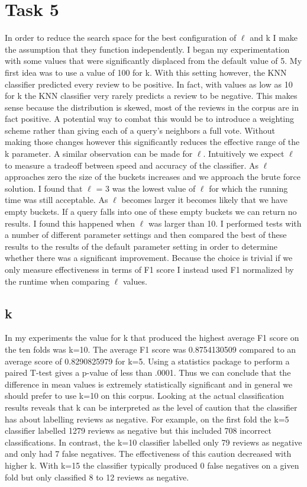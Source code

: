 \documentclass[paper=a4, fontsize=11pt]{jhwhw} %
\begin{document}
\section{Task 5}
In order to reduce the search space for the best configuration of $\ell$ and k I make the assumption that they function independently. I began my experimentation with some values that were significantly displaced from the default value of 5. My first idea was to use a value of 100 for k. With this setting however, the KNN classifier predicted every review to be positive. In fact, with values as low as 10 for k the KNN classifier very rarely predicts a review to be negative. This makes sense because the distribution is skewed, most of the reviews in the corpus are in fact positive. A potential way to combat this would be to introduce a weighting scheme rather than giving each of a query's neighbors a full vote. Without making those changes however this significantly reduces the effective range of the k parameter. A similar observation can be made for $\ell$. Intuitively we expect $\ell$ to measure a tradeoff between speed and accuracy of the classifier. As $\ell$ approaches zero the size of the buckets increases and we approach the brute force solution. I found that $\ell$ = 3 was the lowest value of $\ell$ for which the running time was still acceptable. As $\ell$ becomes larger it becomes likely that we have empty buckets. If a query falls into one of these empty buckets we can return no results. I found this happened when $\ell$ was larger than 10. I performed tests with a number of different parameter settings and then compared the best of these results to the results of the default parameter setting in order to determine whether there was a significant improvement. Because the choice is trivial if we only measure effectiveness in terms of F1 score I instead used F1 normalized by the runtime when comparing $\ell$ values.

\subsection{k}
In my experiments the value for k that produced the highest average F1 score on the ten folds was k=10. The average F1 score was 0.8754130509 compared to an average score of 0.8290825979 for k=5. Using a statistics package to perform a paired T-test gives a p-value of less than .0001. Thus we can conclude that the difference in mean values is extremely statistically significant and in general we should prefer to use k=10 on this corpus. Looking at the actual classification results reveals that k can be interpreted as the level of caution that the classifier has about labelling reviews as negative. For example, on the first fold the k=5 classifier labelled 1279 reviews as negative but this included 708 incorrect classifications. In contrast, the k=10 classifier labelled only 79 reviews as negative and only had 7 false negatives. The effectiveness of this caution decreased with higher k. With k=15 the classifier typically produced 0 false negatives on a given fold but only classified 8 to 12 reviews as negative. 
\end{document}
